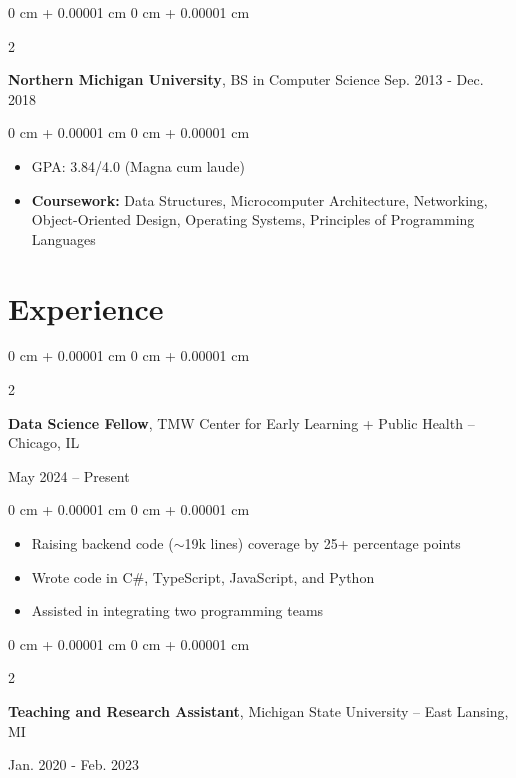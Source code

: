 \documentclass[10pt, letterpaper]{article}
\newenvironment{highlights}{
    \begin{itemize}[
        topsep=0.10 cm,
        parsep=0.10 cm,
        partopsep=0pt,
        itemsep=0pt,
        leftmargin=0 cm + 10pt
    ]
}{
    \end{itemize}
} %
\newenvironment{onecolentry}{
    \begin{adjustwidth}{
        0 cm + 0.00001 cm
    }{
        0 cm + 0.00001 cm
    }
}{
    \end{adjustwidth}
} %
\newenvironment{twocolentry}[2][]{
    \onecolentry
    \def\secondColumn{#2}
    \setcolumnwidth{\fill, 4.5 cm}
    \begin{paracol}{2}
}{
    \switchcolumn \raggedleft \secondColumn
    \end{paracol}
    \endonecolentry
} %
\begin{document}
        \begin{twocolentry}{
            Sep. 2013 - Dec. 2018
        }
            \textbf{Northern Michigan University}, BS in Computer Science\end{twocolentry}

        \vspace{0.10 cm}
        \begin{onecolentry}
            \begin{highlights}
                \item GPA: 3.84/4.0 (Magna cum laude)
                \item \textbf{Coursework:} Data Structures, Microcomputer Architecture, Networking, Object-Oriented Design, Operating Systems, Principles of Programming Languages
            \end{highlights}
        \end{onecolentry}

    \vspace{-5pt}

    \section{Experience}
        
        \begin{twocolentry}{
            May 2024 – Present
        }
            \textbf{Data Science Fellow}, TMW Center for Early Learning + Public Health -- Chicago, IL
        \end{twocolentry}

        \vspace{0.10 cm}
        \begin{onecolentry}
            \begin{highlights}
                \item Raising backend code ($\sim$19k lines) coverage by 25+ percentage points
                \item Wrote code in C\#, TypeScript, JavaScript, and Python
                \item Assisted in integrating two programming teams
            \end{highlights}
        \end{onecolentry}

        \vspace{0.1 cm}

        \begin{twocolentry}{
            Jan. 2020 - Feb. 2023
        }
            \textbf{Teaching and Research Assistant}, Michigan State University -- East Lansing, MI
        \end{twocolentry}
\end{document}
